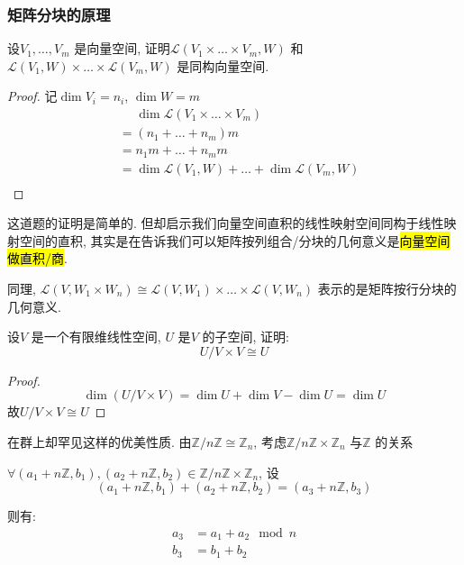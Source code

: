\subsubsection{矩阵分块的原理}
\begin{problem}
    设\(V_1,\dots ,V_{m}\) 是向量空间, 证明\(\mathscr{L}(V_1\times
    \dots \times V_{m},W)\) 和\(\mathscr{L}(V_1,W)\times \dots
    \times \mathscr{L}(V_{m},W)\) 是同构向量空间.
\end{problem}

\begin{proof}
    记\(\dim V_{i}=n_{i}\), \(\dim W=m\)
    \begin{align*}
        &\mathrel{\phantom{=}}\dim \mathscr{L}(V_{1} \times
        \dots \times V_{m}) \\
        &= (n_1+\dots+n_{m})m \\
        &= n_{1}m + \dots + n_{m}m \\
        &= \dim \mathscr{L}(V_{1},W) + \dots +
        \dim \mathscr{L}(V_{m},W)\\
    \end{align*}
\end{proof}
这道题的证明是简单的. 但却启示我们向量空间直积的线性映射空间同构于线性映射空间的直积,
其实是在告诉我们可以矩阵按列组合/分块的几何意义是\hl{向量空间做直积/商}.

同理, \(\mathscr{L}(V,W_1\times W_{n})\cong
    \mathscr{L}(V,W_1)\times \dots \times
\mathscr{L}(V,W_{n})\) 表示的是矩阵按行分块的几何意义.

\begin{problem}
    设\(V\) 是一个有限维线性空间, \(U\) 是\(V\) 的子空间, 证明:
    \[
        U/V \times V \cong U
    \]
\end{problem}

\begin{proof}
    \[
        \dim (U/V \times V) = \dim U + \dim V - \dim U = \dim U
    \]
    故\(U/V \times V \cong U\)
\end{proof}

在群上却罕见这样的优美性质. 由\(\mathbb{Z}/n\mathbb{Z} \cong
\mathbb{Z}_{n}\),
考虑\(\mathbb{Z}/n\mathbb{Z}\times\mathbb{Z}_{n}\) 与\(\mathbb{Z}\) 的关系

\(\forall (a_1+n\mathbb{Z}, b_1),(a_2+n\mathbb{Z}, b_2) \in
\mathbb{Z}/n\mathbb{Z} \times \mathbb{Z}_{n}\), 设\[
    (a_1+n\mathbb{Z}, b_1)+(a_2+n\mathbb{Z}, b_2) =
    (a_3+n\mathbb{Z}, b_3)
\]

则有:
\begin{align*}
    a_3 &= a_1 + a_2 \mod n \\
    b_3 &= b_1 + b_2
\end{align*}

